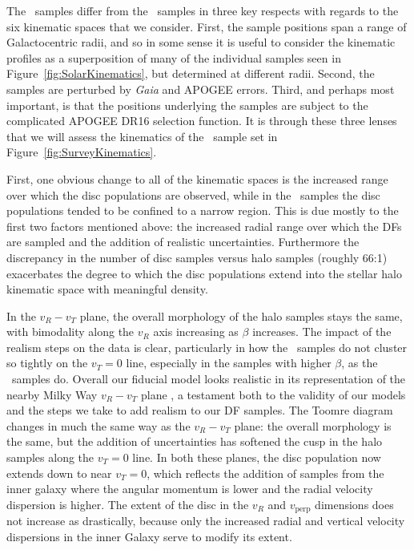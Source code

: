 The \survey\ samples differ from the \solar\ samples in three key respects with regards to the six kinematic spaces that we consider. First, the sample positions span a range of Galactocentric radii, and so in some sense it is useful to consider the kinematic profiles as a superposition of many of the individual samples seen in Figure~\ref{fig:SolarKinematics}, but determined at different radii. Second, the samples are perturbed by \textit{Gaia} and APOGEE errors. Third, and perhaps most important, is that the positions underlying the samples are subject to the complicated APOGEE DR16 selection function. It is through these three lenses that we will assess the kinematics of the \survey\ sample set in Figure~\ref{fig:SurveyKinematics}.

First, one obvious change to all of the kinematic spaces is the increased range over which the disc populations are observed, while in the \solar\ samples the disc populations tended to be confined to a narrow region. This is due mostly to the first two factors mentioned above: the increased radial range over which the DFs are sampled and the addition of realistic uncertainties. Furthermore the discrepancy in the number of disc samples versus halo samples (roughly 66:1) exacerbates the degree to which the disc populations extend into the stellar halo kinematic space with meaningful density.

In the $v_{R}-v_{T}$ plane, the overall morphology of the halo samples stays the same, with bimodality along the $v_{R}$ axis increasing as $\beta$ increases. The impact of the realism steps on the data is clear, particularly in how the \survey\ samples do not cluster so tightly on the $v_{T}=0$ line, especially in the samples with higher $\beta$, as the \solar\ samples do. Overall our fiducial model looks realistic in its representation of the nearby Milky Way $v_{R}-v_{T}$ plane \parencite[c.f. figures 2 and 1 in ][ respectively, although note they use spherical coordinates]{belokurov18,fattahi19}, a testament both to the validity of our models and the steps we take to add realism to our DF samples. The Toomre diagram changes in much the same way as the $v_{R}-v_{T}$ plane: the overall morphology is the same, but the addition of uncertainties has softened the cusp in the halo samples along the $v_{T}=0$ line. In both these planes, the disc population now extends down to near $v_{T}=0$, which reflects the addition of samples from the inner galaxy where the angular momentum is lower and the radial velocity dispersion is higher. The extent of the disc in the $v_{R}$ and $v_\mathrm{perp}$ dimensions does not increase as drastically, because only the increased radial and vertical velocity dispersions in the inner Galaxy serve to modify its extent.


